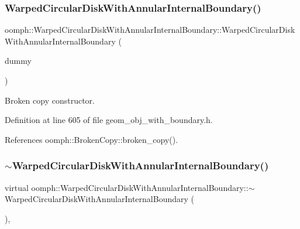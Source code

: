 \subsubsection{\texorpdfstring{Warped\+Circular\+Disk\+With\+Annular\+Internal\+Boundary()}{WarpedCircularDiskWithAnnularInternalBoundary()}\hspace{0.1cm}{\footnotesize\ttfamily [2/2]}}
{\footnotesize\ttfamily oomph\+::\+Warped\+Circular\+Disk\+With\+Annular\+Internal\+Boundary\+::\+Warped\+Circular\+Disk\+With\+Annular\+Internal\+Boundary (\begin{DoxyParamCaption}\item[{const \hyperlink{classoomph_1_1WarpedCircularDiskWithAnnularInternalBoundary}{Warped\+Circular\+Disk\+With\+Annular\+Internal\+Boundary} \&}]{dummy }\end{DoxyParamCaption})\hspace{0.3cm}{\ttfamily [inline]}}



Broken copy constructor. 



Definition at line 605 of file geom\+\_\+obj\+\_\+with\+\_\+boundary.\+h.



References oomph\+::\+Broken\+Copy\+::broken\+\_\+copy().

\mbox{\label{classoomph_1_1WarpedCircularDiskWithAnnularInternalBoundary_a2494621470d9fa2d920da5235f32e18a}} 
\subsubsection{\texorpdfstring{$\sim$\+Warped\+Circular\+Disk\+With\+Annular\+Internal\+Boundary()}{~WarpedCircularDiskWithAnnularInternalBoundary()}}
{\footnotesize\ttfamily virtual oomph\+::\+Warped\+Circular\+Disk\+With\+Annular\+Internal\+Boundary\+::$\sim$\+Warped\+Circular\+Disk\+With\+Annular\+Internal\+Boundary (\begin{DoxyParamCaption}{ }\end{DoxyParamCaption})\hspace{0.3cm}{\ttfamily [inline]}, {\ttfamily [virtual]}}



